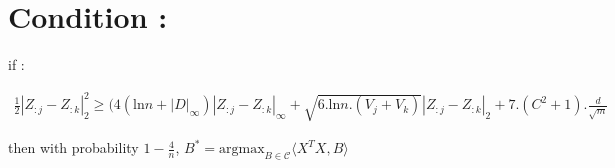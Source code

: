 \section*{Condition :}

if :

\begin{align*}
\frac{1}{2}|Z_{:j} - Z_{:k}|_2^2 \ge (4(\mbox{ln}n+|D|_{\infty})|Z_{:j} - Z_{:k}|_{\infty} + \sqrt{6.\mbox{ln}n.(V_{j}+V_{k})} |Z_{:j} - Z_{:k}|_2 + 7.(C^2+1).\frac{d}{\sqrt{m}}
\end{align*}

then with probability $1 - \frac{4}{n}$, $B^*=\mbox{argmax}_{B \in \mathcal{C}}\langle X^TX, B \rangle$